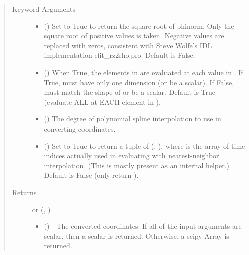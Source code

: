 \documentclass[letterpaper,10pt,english]{sphinxmanual}
\begin{document}
\begin{fulllineitems}
\begin{fulllineitems}
\begin{quote}
\begin{description}
\begin{itemize}
\end{itemize}

\item[{Keyword Arguments}] \leavevmode\begin{itemize}
\item {} 
 () \textendash{} Set to True to return the square root of phinorm.
Only the square root of positive values is taken. Negative
values are replaced with zeros, consistent with Steve Wolfe’s
IDL implementation efit\_rz2rho.pro. Default is False.

\item {} 
 () \textendash{} When True, the elements in  are evaluated
at each value in . If True,  must have only one dimension
(or be a scalar). If False,  must match the shape of 
or be a scalar. Default is True (evaluate ALL  at EACH
element in ).

\item {} 
 () \textendash{} The degree of polynomial spline interpolation to
use in converting coordinates.

\item {} 
 () \textendash{} Set to True to return a tuple of (,
), where  is the array of time indices
actually used in evaluating  with nearest-neighbor
interpolation. (This is mostly present as an internal helper.)
Default is False (only return ).

\end{itemize}

\item[{Returns}] \leavevmode

 or (, )
\begin{itemize}
\item {} 
 () - The converted coordinates. If
all of the input arguments are scalar, then a scalar is returned.
Otherwise, a scipy Array is returned.


\end{itemize}
\end{description}
\end{quote}
\end{fulllineitems}
\end{fulllineitems}
\end{document}

